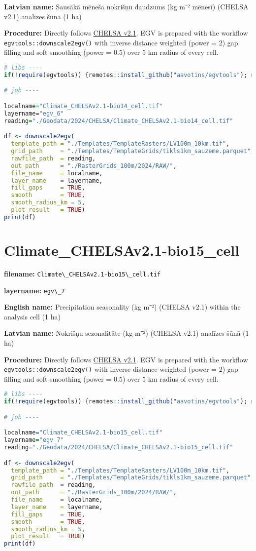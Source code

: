 \documentclass[
]{book}
\newcommand{\passthrough}[1]{#1}
\begin{document}
\textbf{Latvian name:} Sausākā mēneša nokrišņu daudzums (kg m⁻² mēnesī) (CHELSA v2.1) analīzes šūnā (1 ha)

\textbf{Procedure:} Directly follows \hyperref[Ch04.11]{CHELSA v2.1}. EGV is prepared with the
workflow \passthrough{\lstinline!egvtools::downscale2egv()!} with inverse distance weighted (power = 2)
gap filling and soft smoothing (power = 0.5) over 5 km radius of every cell.

\begin{lstlisting}[language=R]
# libs ----
if(!require(egvtools)) {remotes::install_github("aavotins/egvtools"); require(egvtools)}

# job ----

localname="Climate_CHELSAv2.1-bio14_cell.tif"
layername="egv_6"
reading="./Geodata/2024/CHELSA/Climate_CHELSAv2.1-bio14_cell.tif"

df <- downscale2egv(
  template_path = "./Templates/TemplateRasters/LV100m_10km.tif",
  grid_path     = "./Templates/TemplateGrids/tikls1km_sauzeme.parquet",
  rawfile_path  = reading,
  out_path      = "./RasterGrids_100m/2024/RAW/",
  file_name     = localname,
  layer_name    = layername,
  fill_gaps     = TRUE,
  smooth        = TRUE,
  smooth_radius_km = 5,
  plot_result   = TRUE)
print(df)
\end{lstlisting}

\section{Climate\_CHELSAv2.1-bio15\_cell}\label{ch06.007}

\textbf{filename:} \passthrough{\lstinline!Climate\_CHELSAv2.1-bio15\_cell.tif!}

\textbf{layername:} \passthrough{\lstinline!egv\_7!}

\textbf{English name:} Precipitation seasonality (kg m⁻²) (CHELSA v2.1) within the analysis cell (1 ha)

\textbf{Latvian name:} Nokrišņu sezonalitāte (kg m⁻²) (CHELSA v2.1) analīzes šūnā (1 ha)

\textbf{Procedure:} Directly follows \hyperref[Ch04.11]{CHELSA v2.1}. EGV is prepared with the
workflow \passthrough{\lstinline!egvtools::downscale2egv()!} with inverse distance weighted (power = 2)
gap filling and soft smoothing (power = 0.5) over 5 km radius of every cell.

\begin{lstlisting}[language=R]
# libs ----
if(!require(egvtools)) {remotes::install_github("aavotins/egvtools"); require(egvtools)}

# job ----

localname="Climate_CHELSAv2.1-bio15_cell.tif"
layername="egv_7"
reading="./Geodata/2024/CHELSA/Climate_CHELSAv2.1-bio15_cell.tif"

df <- downscale2egv(
  template_path = "./Templates/TemplateRasters/LV100m_10km.tif",
  grid_path     = "./Templates/TemplateGrids/tikls1km_sauzeme.parquet",
  rawfile_path  = reading,
  out_path      = "./RasterGrids_100m/2024/RAW/",
  file_name     = localname,
  layer_name    = layername,
  fill_gaps     = TRUE,
  smooth        = TRUE,
  smooth_radius_km = 5,
  plot_result   = TRUE)
print(df)
\end{lstlisting}
\end{document}
